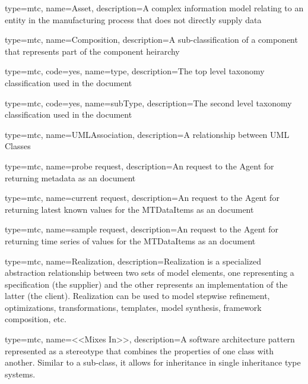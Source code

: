 {
  type=mtc,
  name=Asset,
  description={A complex information model relating to an entity in the manufacturing process that does not directly supply data}
}

{
  type=mtc,
  name=Composition,
  description={A sub-classification of a component that represents part of the component heirarchy}
}

{
  type=mtc,
  code=yes,
  name=type,
  description={The top level taxonomy classification used in the  document}
}

{
  type=mtc,
  code=yes,
  name=subType,
  description={The second level taxonomy classification used in the  document}
}

{
  type=mtc,
  name=UMLAssociation,
  description={A relationship between UML Classes}
}

{
  type=mtc,
  name={probe request},
  description={An  request to the \gls{Agent} for returning metadata as an   document}
}

{
  type=mtc,
  name={current request},
  description={An  request to the \gls{Agent} for returning latest known values for the \glspl{MTDataItem} as an   document}
}

{
  type=mtc,
  name={sample request},
  description={An  request to the \gls{Agent} for returning time series of values for the \glspl{MTDataItem} as an   document}
}

{
  type=mtc,
  name=Realization,
  description={Realization is a specialized abstraction relationship between two sets of model elements, one representing a specification (the supplier) and the other represents an implementation of the latter (the client). Realization can be used to model stepwise refinement, optimizations, transformations, templates, model synthesis, framework composition, etc.}
}

{
  type=mtc,
  name={<<Mixes In>>},
  description={A software architecture pattern represented as a \gls{stereotype} that combines the properties of one class with another. Similar to a sub-class, it allows for inheritance in single inheritance type systems.}
}


